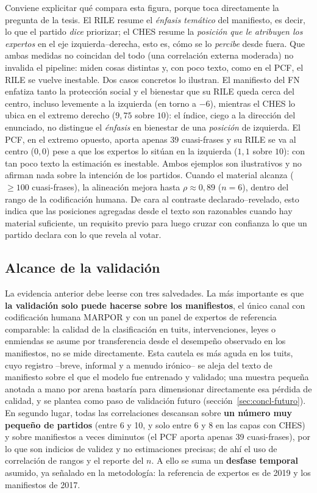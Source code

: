 Conviene explicitar qué compara esta figura, porque toca directamente la pregunta
de la tesis. El RILE resume el \emph{énfasis temático} del manifiesto, es decir,
lo que el partido \emph{dice} priorizar; el CHES resume la \emph{posición que le
atribuyen los expertos} en el eje izquierda--derecha, esto es, cómo se lo
\emph{percibe} desde fuera. Que ambas medidas no coincidan del todo (una
correlación externa moderada) no invalida el pipeline: miden cosas
distintas y, con poco texto, como en el PCF, el RILE se vuelve inestable. Dos
casos concretos lo ilustran. El manifiesto del FN enfatiza tanto la protección
social y el bienestar que su RILE queda cerca del centro, incluso levemente a la
izquierda (en torno a $-6$), mientras el CHES lo ubica en el extremo derecho
($9{,}75$ sobre $10$): el índice, ciego a la dirección del enunciado, no distingue
el \emph{énfasis} en bienestar de una \emph{posición} de izquierda. El PCF, en el
extremo opuesto, aporta apenas $39$ cuasi-frases y su RILE se va al centro
($0{,}0$) pese a que los expertos lo sitúan en la izquierda ($1{,}1$ sobre $10$):
con tan poco texto la estimación es inestable. Ambos ejemplos son ilustrativos y
no afirman nada sobre la intención de los partidos. Cuando
el material alcanza ($\geq 100$ cuasi-frases), la alineación mejora hasta
$\rho \approx 0{,}89$ ($n=6$), dentro del rango de la codificación humana. De cara
al contraste declarado--revelado, esto indica que las posiciones agregadas
desde el texto son razonables cuando hay material suficiente, un requisito previo
para luego cruzar con confianza lo que un partido declara con lo que revela al
votar.

\subsection{Alcance de la validación}
\label{sec:res-val-alcance}

La evidencia anterior debe leerse con tres salvedades. La más importante es que
\textbf{la validación solo puede hacerse sobre los manifiestos}, el único canal
con codificación humana MARPOR y con un panel de expertos de referencia comparable:
la calidad de la clasificación en tuits, intervenciones, leyes o enmiendas se
asume por transferencia desde el desempeño observado en los manifiestos, no se
mide directamente. Esta cautela es más aguda en los tuits, cuyo registro --breve,
informal y a menudo irónico-- se aleja del texto de manifiesto sobre el que el
modelo fue entrenado y validado; una muestra pequeña anotada a mano por arena
bastaría para dimensionar directamente esa pérdida de calidad, y se plantea como
paso de validación futuro (sección~\ref{sec:concl-futuro}). En segundo lugar,
todas las correlaciones descansan sobre
\textbf{un número muy pequeño de partidos} (entre 6 y 10, y solo entre 6 y 8 en
las capas con CHES) y sobre manifiestos a veces diminutos (el PCF aporta apenas
39 cuasi-frases), por lo que son indicios de validez y no estimaciones
precisas; de ahí el uso de correlación de rangos y el reporte del $n$. A ello se
suma un \textbf{desfase temporal} asumido, ya señalado en la metodología: la
referencia de expertos es de 2019 y los manifiestos de 2017.

